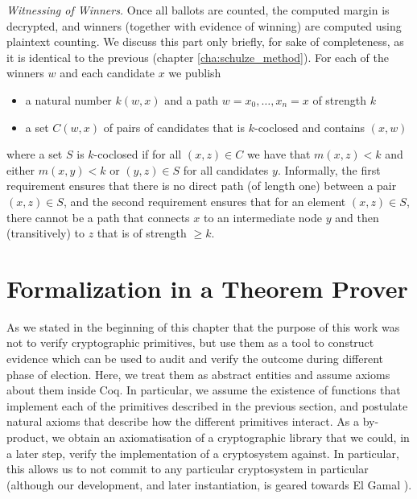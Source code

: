 \smallskip\noindent\emph{Witnessing of Winners.}
Once all ballots are counted, the computed margin is decrypted, and
winners (together with evidence of winning) are computed using 
plaintext counting. We discuss this part only briefly, for sake of completeness,
 as it is identical to the previous (chapter \ref{cha:schulze_method}).
 For each of the winners $w$ and each
candidate $x$ we publish
\begin{itemize}
\item a natural number $k(w, x)$ and a path $w = x_0, \dots, x_n = x$ of strength $k$
\item a set $C(w, x)$ of pairs of candidates that is $k$-coclosed
and contains $(x, w)$
\end{itemize}
where a set $S$ is  $k$-coclosed if for all $(x,z) \in C$ we have
that $m(x, z) < k$ and either $m(x, y) < k$ or $(y,z) \in S$ for
all candidates $y$.  Informally, the first requirement ensures that
there is no direct path (of length one) between a pair $(x, z) \in
S$, and the second requirement ensures that for an element $(x, z)
\in S$, there cannot be a path that connects $x$ to an intermediate
node $y$ and then (transitively) to $z$ that is of strength $\geq
k$.


\section{Formalization in a Theorem Prover} \label{sec:realisation}



As we stated in the beginning of this chapter that the purpose of this work was 
not to verify cryptographic primitives, 
but use them as a tool to construct evidence which can be used 
to audit and verify the outcome during different phase 
of election. Here, we treat them as abstract entities and assume
axioms about them inside Coq.
In particular, we assume the existence of functions that implement
each of the primitives described in the previous section, and
postulate natural axioms that describe how the different primitives
interact. As a by-product, we obtain an axiomatisation of a
cryptographic library that we could, in a later step, verify the
implementation of a cryptosystem against.  In particular, this
allows us to not commit to any particular cryptosystem in particular
(although our development, and later instantiation, is geared
towards El Gamal \citep{DBLP:conf/crypto/Gamal84}).

